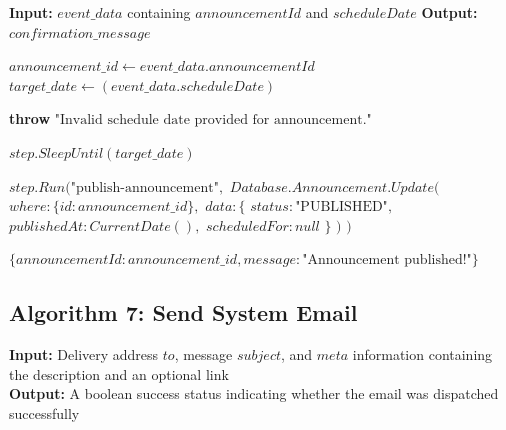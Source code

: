 \begin{algorithm}[htbp]
\caption{HOD Scheduled Announcement Handler}
\begin{algorithmic}[1]

\State \textbf{Input:} $event\_data$ containing $announcementId$ and $scheduleDate$
\State \textbf{Output:} $confirmation\_message$


    \State {}
    \State $announcement\_id \gets event\_data.announcementId$
    \State $target\_date \gets (event\_data.scheduleDate)$

    \State {}
        \State \textbf{throw} $\text{"Invalid schedule date provided for announcement."}$
    \EndIf

    \State {}
    \State $step.SleepUntil(target\_date)$

    \State {}
    \State $step.Run(\text{"publish-announcement"},$
    \State \quad {}
    \State \quad \quad $Database.Announcement.Update($
    \State \quad \quad \quad $where: \{ id: announcement\_id \},$
    \State \quad \quad \quad $data: \{$
    \State \quad \quad \quad \quad $status: \text{"PUBLISHED"},$
    \State \quad \quad \quad \quad $publishedAt: CurrentDate(),$
    \State \quad \quad \quad \quad $scheduledFor: null$
    \State \quad \quad \quad $\}$
    \State \quad \quad $)$
    \State \quad \EndFunction
    \State $)$

    \State \Return $\{ announcementId: announcement\_id, message: \text{"Announcement published!"} \}$

\EndFunction

\end{algorithmic}
\end{algorithm}


\subsection{Algorithm 7: Send System Email}

\textbf{Input:} Delivery address $to$, message $subject$, and $meta$ information containing the description and an optional link \\
\textbf{Output:} A boolean success status indicating whether the email was dispatched successfully \\

